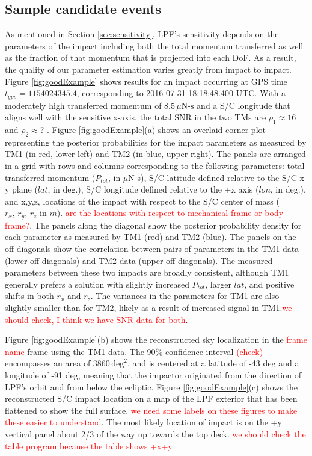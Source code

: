 \documentclass[preprint, trackchanges]{aastex61}
\newcommand{\red}[1]{\textcolor{red}{#1}}
\begin{document}
\subsection{Sample candidate events \label{sec:samples}}
As mentioned in Section \ref{sec:sensitivity}, LPF's sensitivity depends on the parameters of the impact including both the total momentum transferred as well as the fraction of that momentum that is  projected into each DoF.  As a result, the quality of our parameter estimation varies greatly from impact to impact.  Figure \ref{fig:goodExample} shows results for an impact occurring at GPS time $t_{gps}=1154024345.4$, corresponding to 2016-07-31 18:18:48.400 UTC. With a moderately high transferred momentum of $8.5\,\mu\textrm{N-s}$ and a S/C longitude that aligns well with the sensitive x-axis, the total SNR in the two TMs are $\rho_1\approx16$ and $\rho_2\approx?$ . Figure \ref{fig:goodExample}(a) shows an overlaid corner plot representing the posterior probabilities for the impact parameters as measured by TM1 (in red, lower-left) and TM2 (in blue, upper-right).  The panels are arranged in a grid with rows and columns corresponding to the following parameters: total transferred momentum ($P_{tot}$, in $\mu$N-s), S/C latitude defined relative to the S/C x-y plane ($lat$, in deg.), S/C longitude defined relative to the +x axis ($lon$, in deg.), and x,y,z, locations of the impact with respect to the S/C center of mass ($r_x,\,r_y,\,r_z$ in $m$). \red{are the locations with respect to mechanical frame or body frame?}. The panels along the diagonal show the posterior probability density for each parameter as measured by TM1 (red) and TM2 (blue).  The panels on the off-diagonals show the correlation between pairs of parameters in the TM1 data (lower off-diagonals) and TM2 data (upper off-diagonals). The measured parameters between these two impacts are broadly consistent, although TM1 generally prefers a solution with slightly increased $P_{tot}$, larger $lat$, and positive shifts in both $r_x$ and $r_z$. The variances in the parameters for TM1 are also slightly smaller than for TM2, likely as a result of increased signal in TM1.\red{we should check, I think we have SNR data for both}.

Figure \ref{fig:goodExample}(b) shows the reconstructed sky localization in the \red{frame name} frame using the TM1 data.  The 90\% confidence interval \red{(check)} encompasses an area of 3860$\,\textrm{deg}^2$. and is centered at a latitude of -43 deg and a longitude of -91 deg, meaning that the impactor originated from the direction of LPF's orbit and from below the ecliptic. Figure \ref{fig:goodExample}(c) shows the reconstructed S/C impact location on a map of the LPF exterior that has been flattened to show the full surface. \red{we need some labels on these figures to make these easier to understand}.  The most likely location of impact is on the +y vertical panel about 2/3 of the way up towards the top deck. \red{we should check the table program because the table shows +x+y}.
\end{document}
